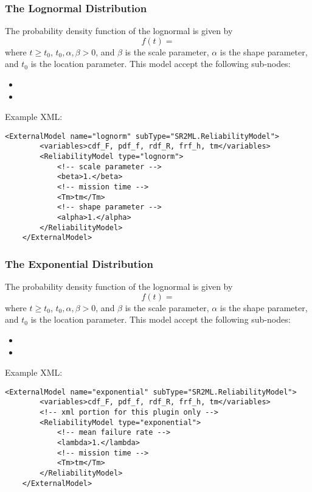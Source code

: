 \subsubsection{The Lognormal Distribution}
The probability density function of the lognormal is given by
\begin{equation}
	f(t) =
\end{equation}
where $t\geq t_0$, $t_0, \alpha, \beta >0$, and $\beta$ is the scale parameter, $\alpha$ is the shape
parameter, and $t_0$ is the location parameter.
This model accept the following sub-nodes:
\begin{itemize}
	\item {}
	\item {}
\end{itemize}

Example XML:
\begin{lstlisting}[style=XML]
	<ExternalModel name="lognorm" subType="SR2ML.ReliabilityModel">
		<variables>cdf_F, pdf_f, rdf_R, frf_h, tm</variables>
		<ReliabilityModel type="lognorm">
			<!-- scale parameter -->
			<beta>1.</beta>
			<!-- mission time -->
			<Tm>tm</Tm>
			<!-- shape parameter -->
			<alpha>1.</alpha>
		</ReliabilityModel>
	</ExternalModel>
\end{lstlisting}

\subsubsection{The Exponential Distribution}
The probability density function of the lognormal is given by
\begin{equation}
	f(t) =
\end{equation}
where $t\geq t_0$, $t_0, \alpha, \beta >0$, and $\beta$ is the scale parameter, $\alpha$ is the shape
parameter, and $t_0$ is the location parameter.
This model accept the following sub-nodes:
\begin{itemize}
	\item {}
	\item {}
\end{itemize}

Example XML:
\begin{lstlisting}[style=XML]
	<ExternalModel name="exponential" subType="SR2ML.ReliabilityModel">
		<variables>cdf_F, pdf_f, rdf_R, frf_h, tm</variables>
		<!-- xml portion for this plugin only -->
		<ReliabilityModel type="exponential">
			<!-- mean failure rate -->
			<lambda>1.</lambda>
			<!-- mission time -->
			<Tm>tm</Tm>
		</ReliabilityModel>
	</ExternalModel>
\end{lstlisting}

